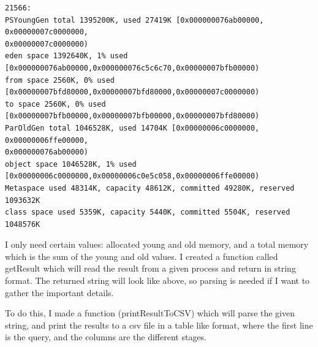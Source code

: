 \begin{lstlisting}
21566:
PSYoungGen total 1395200K, used 27419K [0x000000076ab00000, 0x00000007c0000000,
0x00000007c0000000)
eden space 1392640K, 1% used
[0x000000076ab00000,0x000000076c5c6c70,0x00000007bfb00000)
from space 2560K, 0% used [0x00000007bfd80000,0x00000007bfd80000,0x00000007c0000000)
to space 2560K, 0% used [0x00000007bfb00000,0x00000007bfb00000,0x00000007bfd80000)
ParOldGen total 1046528K, used 14704K [0x00000006c0000000, 0x00000006ffe00000,
0x000000076ab00000)
object space 1046528K, 1% used
[0x00000006c0000000,0x00000006c0e5c058,0x00000006ffe00000)
Metaspace used 48314K, capacity 48612K, committed 49280K, reserved 1093632K
class space used 5359K, capacity 5440K, committed 5504K, reserved 1048576K
\end{lstlisting}

I only need certain values: allocated young and old memory, and a total memory which is the sum of the young and old values. I created a function called getResult which will read the result from a given process and return in string format. The returned string will look like above, so parsing is needed if I want to gather the important details.

To do this, I made a function (printResultToCSV) which will parse the given string, and print the results to a csv file in a table like format, where the first line is the query, and the columns are the different stages.


